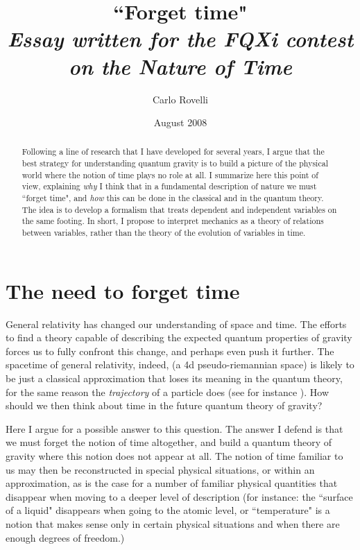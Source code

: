 \documentclass[10pt,nofootinbib]{revtex4}
\begin{document}
\title{{\Large ``Forget time"}\\
{\normalsize\rm\em Essay written for the FQXi contest on the Nature of Time}}
\author{Carlo Rovelli}
\date{\small August 2008}
\begin{abstract}
\noindent Following a line of research that I have developed for several years, I argue that
the best strategy for understanding quantum gravity is to build a picture of the
physical world where the notion of time plays no role at all.  I summarize
here this point of view, explaining \emph{why} I think that in a fundamental description of 
nature  we must ``forget time", and \emph{how} this can be done in the classical
and in the quantum theory.  The idea is to develop a formalism that treats
dependent and independent variables on the same footing. In short, I
propose to interpret mechanics as a theory of relations between variables, 
rather than  the theory of the evolution of variables in time.
\end{abstract}
\maketitle


\section{The need to forget time}

General relativity has changed our understanding of space and time. The efforts to find a theory capable of describing the expected quantum properties of  gravity forces us to fully confront this change, and perhaps even push it further.  The spacetime of general relativity, indeed, (a 4d pseudo-riemannian space) is likely to be just a classical approximation  that loses its meaning in the quantum theory, for the same reason the {\em trajectory} of a particle does (see for instance \cite{Ashtekar:2004vs}).   How should we then think about time in the future quantum theory of gravity? 

Here I argue for a possible answer to this question.  The answer I defend is that we must forget the notion of time altogether, and build a quantum theory of gravity where this notion does not appear at all. The notion of time familiar to us may then be reconstructed in special physical situations, or within an approximation, as is the case for a number of familiar physical quantities that disappear when moving to a deeper level of description (for instance: the ``surface of a liquid" disappears when going to the atomic level, or ``temperature" is a notion that makes sense only in certain physical situations and when there are enough degrees of freedom.) 
\end{document}
